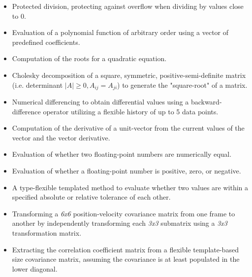 \documentclass[11pt,fleqn]{report}
\begin{document}
\begin{itemize}
\item Protected division, protecting against overflow when dividing by
values close to 0.
\item Evaluation of a polynomial function of arbitrary order using a vector
of predefined coefficients.
\item Computation of the roots for a quadratic equation.
\item Cholesky decomposition of a square, symmetric, positive-semi-definite
matrix (i.e. determinant $|A| \geqslant 0, A_{ij} = A_{ji}$)
to generate the "square-root" of a matrix.
\item Numerical differencing to obtain differential values using a
backward-difference operator utilizing a flexible history of up to 5
data points.
\item Computation of the derivative of a unit-vector from the current
values of the vector and the vector derivative.
\item Evaluation of whether two floating-point numbers are numerically equal.
\item Evaluation of whether a floating-point number is positive, zero, or negative.
\item A type-flexible templated method to evaluate whether two values are
within a specified absolute or relative tolerance of each other.
\item Transforming a \textit{6x6} position-velocity covariance matrix from one frame
to another by independently transforming each \textit{3x3} submatrix using a 
\textit{3x3} transformation matrix.
\item Extracting the correlation coefficient matrix from a flexible template-based
size covariance matrix, assuming the covariance is at least populated in the 
lower diagonal.


\end{itemize}
\end{document}
